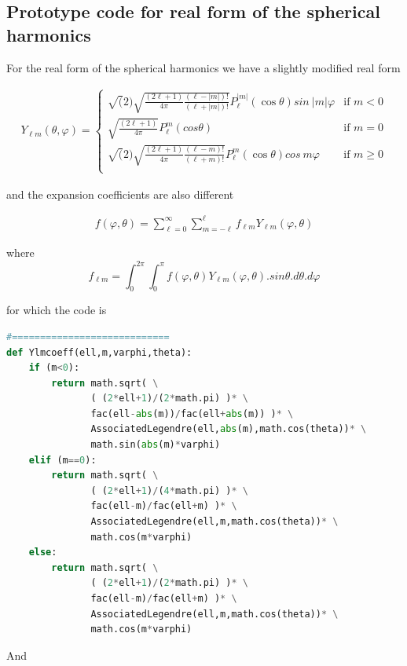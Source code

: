 \documentclass[11pt,letterpaper,titlepage]{article}
\newcommand{\beqn}{\begin{equation}
	\begin{aligned}}
\newcommand{\eeqn}{\end{aligned}
	\end{equation}}
\numberwithin{equation}{section}
\begin{document}
\subsection{Prototype code for real form of the spherical harmonics}
For the real form of the spherical harmonics we have a slightly modified real form 

\beqn
Y_{\ell m} (\theta, \varphi )=
\begin{cases}
 \sqrt(2)\sqrt{ \frac{(2\ell + 1)}{4\pi}   \frac{(\ell-|m|)!}{(\ell+|m|)!}}P_{\ell}^{|m|}(\cos\theta)sin\ {|m|\varphi}
& \text{if } m < 0 \\
\sqrt{ \frac{(2\ell + 1)}{4\pi}} P_{\ell}^{m}(cos\theta) & \text{if } m = 0 \\
 \sqrt(2)\sqrt{ \frac{(2\ell + 1)}{4\pi}   \frac{(\ell-m)!}{(\ell+m)!}}P_{\ell}^{m}(\cos\theta)cos\ {m\varphi}
& \text{if } m \ge 0 \\
\end{cases}
\eeqn

and the expansion coefficients are also different

\beqn 
f(\varphi,\theta) = \sum_{\ell = 0}^\infty \sum_{m=-\ell}^{\ell} f_{\ell m} Y_{\ell m}(\varphi,\theta)
\eeqn 

where
$$
f_{\ell m} = \int_{0}^{2\pi} \int_0^\pi f(\varphi,\theta)Y_{\ell m}(\varphi,\theta).sin\theta.d\theta.d\varphi
$$

for which the code is

\begin{lstlisting}[language=python]
#============================    
def Ylmcoeff(ell,m,varphi,theta):
    if (m<0):
        return math.sqrt( \
               ( (2*ell+1)/(2*math.pi) )* \
               fac(ell-abs(m))/fac(ell+abs(m)) )* \
               AssociatedLegendre(ell,abs(m),math.cos(theta))* \
               math.sin(abs(m)*varphi)
    elif (m==0):
        return math.sqrt( \
               ( (2*ell+1)/(4*math.pi) )* \
               fac(ell-m)/fac(ell+m) )* \
               AssociatedLegendre(ell,m,math.cos(theta))* \
               math.cos(m*varphi)
    else:
        return math.sqrt( \
               ( (2*ell+1)/(2*math.pi) )* \
               fac(ell-m)/fac(ell+m) )* \
               AssociatedLegendre(ell,m,math.cos(theta))* \
               math.cos(m*varphi)
\end{lstlisting}

And
\end{document}
